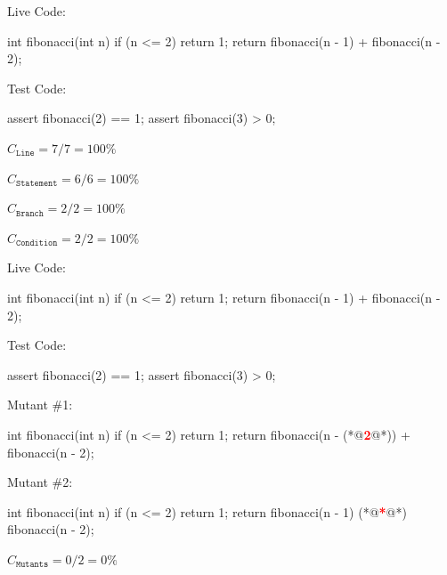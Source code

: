 \documentclass{article}
\begin{document}

\begin{multicols}{2}
Live Code:\par
{\small\begin{ffcode}
int fibonacci(int n) {
  if (n <= 2) {
    return 1;
  }
  return fibonacci(n - 1)
    + fibonacci(n - 2);
}
\end{ffcode}
}
\par\columnbreak\par
Test Code:\par
{\small\begin{ffcode}
assert fibonacci(2) == 1;
assert fibonacci(3) > 0;
\end{ffcode}
}
\( C_{\texttt{Line}} = 7/7 = 100\% \)\par
\( C_{\texttt{Statement}} = 6/6 = 100\% \)\par
\( C_{\texttt{Branch}} = 2/2 = 100\% \)\par
\( C_{\texttt{Condition}} = 2/2 = 100\% \)\par
\end{multicols}
\plush{}

\begin{pptWide}{3}
Live Code:\par
{\small\begin{ffcode}
int fibonacci(int n) {
  if (n <= 2) {
    return 1;
  }
  return fibonacci(n - 1)
    + fibonacci(n - 2);
}
\end{ffcode}
}
\par
Test Code:\par
{\small\begin{ffcode}
assert fibonacci(2) == 1;
assert fibonacci(3) > 0;
\end{ffcode}
}
\par\columnbreak\par
Mutant \#1:\par
{\small\begin{ffcode}
int fibonacci(int n) {
  if (n <= 2) {
    return 1;
  }
  return fibonacci(n - (*@\textcolor{red}{\textbf{2}}@*))
    + fibonacci(n - 2);
}
\end{ffcode}
}
\par\columnbreak\par
Mutant \#2:\par
{\small\begin{ffcode}
int fibonacci(int n) {
  if (n <= 2) {
    return 1;
  }
  return fibonacci(n - 1)
    (*@\textcolor{red}{\textbf{*}}@*) fibonacci(n - 2);
}
\end{ffcode}
}
\par
\( C_{\texttt{Mutants}} = 0/2 = 0\% \)\par
\end{pptWide}
\plush{}
\end{document}
